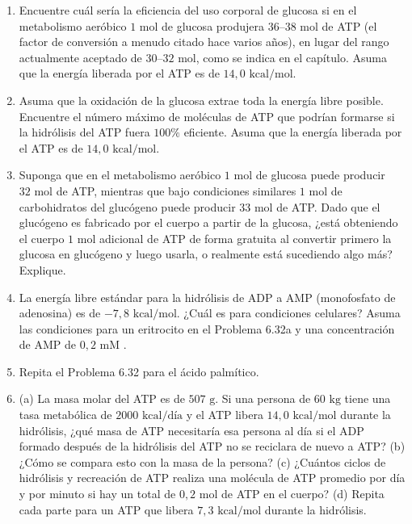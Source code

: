\documentclass[12pt]{book}
\begin{document}
\begin{enumerate}
\item[6.33] Encuentre cuál sería la eficiencia del uso corporal de glucosa si en el metabolismo aeróbico $1\text{ mol}$ de glucosa produjera $36\text{--}38\text{ mol}$ de ATP (el factor de conversión a menudo citado hace varios años), en lugar del rango actualmente aceptado de $30\text{--}32\text{ mol}$, como se indica en el capítulo. Asuma que la energía liberada por el ATP es de $14{,}0\text{ kcal/mol}$.

\item[6.34] Asuma que la oxidación de la glucosa extrae toda la energía libre posible. Encuentre el número máximo de moléculas de ATP que podrían formarse si la hidrólisis del ATP fuera $100\%$ eficiente. Asuma que la energía liberada por el ATP es de $14{,}0\text{ kcal/mol}$.

\item[6.35] Suponga que en el metabolismo aeróbico $1\text{ mol}$ de glucosa puede producir $32\text{ mol}$ de ATP, mientras que bajo condiciones similares $1\text{ mol}$ de carbohidratos del glucógeno puede producir $33\text{ mol}$ de ATP. Dado que el glucógeno es fabricado por el cuerpo a partir de la glucosa, ¿está obteniendo el cuerpo $1\text{ mol}$ adicional de ATP de forma gratuita al convertir primero la glucosa en glucógeno y luego usarla, o realmente está sucediendo algo más? Explique.

\item[6.36] La energía libre estándar para la hidrólisis de ADP a AMP (monofosfato de adenosina) es de $-7{,}8\text{ kcal/mol}$. ¿Cuál es para condiciones celulares? Asuma las condiciones para un eritrocito en el Problema 6.32a y una concentración de AMP de $0{,}2\text{ mM}$ \cite{75}.

\item[6.37] Repita el Problema 6.32 para el ácido palmítico.

\item[6.38] (a) La masa molar del ATP es de $507\text{ g}$. Si una persona de $60\text{ kg}$ tiene una tasa metabólica de $2000\text{ kcal/día}$ y el ATP libera $14{,}0\text{ kcal/mol}$ durante la hidrólisis, ¿qué masa de ATP necesitaría esa persona al día si el ADP formado después de la hidrólisis del ATP no se reciclara de nuevo a ATP? (b) ¿Cómo se compara esto con la masa de la persona? (c) ¿Cuántos ciclos de hidrólisis y recreación de ATP realiza una molécula de ATP promedio por día y por minuto si hay un total de $0{,}2\text{ mol}$ de ATP en el cuerpo? (d) Repita cada parte para un ATP que libera $7{,}3\text{ kcal/mol}$ durante la hidrólisis.


\end{enumerate}
\end{document}
